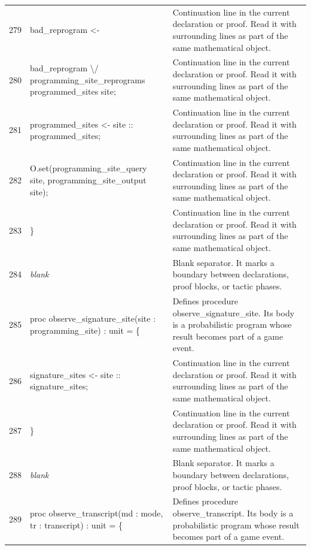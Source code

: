 \documentclass[10pt]{article}
\begin{document}
\begin{longtable}{r L{0.53\textwidth} L{0.37\textwidth}}
279 & {\ttfamily\scriptsize     bad\_reprogram <-} & Continuation line in the current declaration or proof.  Read it with surrounding lines as part of the same mathematical object. \\
280 & {\ttfamily\scriptsize       bad\_reprogram \textbackslash{}/ programming\_site\_reprograms programmed\_sites site;} & Continuation line in the current declaration or proof.  Read it with surrounding lines as part of the same mathematical object. \\
281 & {\ttfamily\scriptsize     programmed\_sites <- site :: programmed\_sites;} & Continuation line in the current declaration or proof.  Read it with surrounding lines as part of the same mathematical object. \\
282 & {\ttfamily\scriptsize     O.set(programming\_site\_query site, programming\_site\_output site);} & Continuation line in the current declaration or proof.  Read it with surrounding lines as part of the same mathematical object. \\
283 & {\ttfamily\scriptsize   \}} & Continuation line in the current declaration or proof.  Read it with surrounding lines as part of the same mathematical object. \\
284 & {\ttfamily\scriptsize \emph{blank}} & Blank separator.  It marks a boundary between declarations, proof blocks, or tactic phases. \\
285 & {\ttfamily\scriptsize   proc observe\_signature\_site(site : programming\_site) : unit = \{} & Defines procedure observe\_signature\_site.  Its body is a probabilistic program whose result becomes part of a game event. \\
286 & {\ttfamily\scriptsize     signature\_sites <- site :: signature\_sites;} & Continuation line in the current declaration or proof.  Read it with surrounding lines as part of the same mathematical object. \\
287 & {\ttfamily\scriptsize   \}} & Continuation line in the current declaration or proof.  Read it with surrounding lines as part of the same mathematical object. \\
288 & {\ttfamily\scriptsize \emph{blank}} & Blank separator.  It marks a boundary between declarations, proof blocks, or tactic phases. \\
289 & {\ttfamily\scriptsize   proc observe\_transcript(md : mode, tr : transcript) : unit = \{} & Defines procedure observe\_transcript.  Its body is a probabilistic program whose result becomes part of a game event. \\

\end{longtable}
\end{document}
